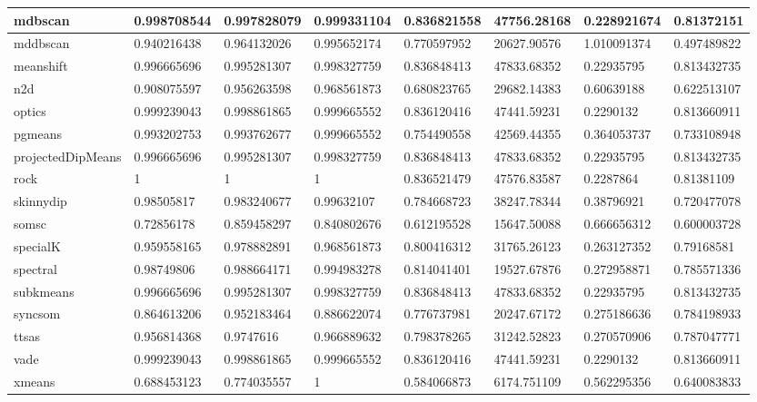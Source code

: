 \begin{table}[H]
\begin{tabular}{|l|l|l|l|l|l|l|l|}
\hline
mdbscan & 0.998708544 & 0.997828079 & 0.999331104 & 0.836821558 & 47756.28168 & 0.228921674 & 0.81372151 \\
\hline
mddbscan & 0.940216438 & 0.964132026 & 0.995652174 & 0.770597952 & 20627.90576 & 1.010091374 & 0.497489822 \\
\hline
meanshift & 0.996665696 & 0.995281307 & 0.998327759 & 0.836848413 & 47833.68352 & 0.22935795 & 0.813432735 \\
\hline
n2d & 0.908075597 & 0.956263598 & 0.968561873 & 0.680823765 & 29682.14383 & 0.60639188 & 0.622513107 \\
\hline
optics & 0.999239043 & 0.998861865 & 0.999665552 & 0.836120416 & 47441.59231 & 0.2290132 & 0.813660911 \\
\hline
pgmeans & 0.993202753 & 0.993762677 & 0.999665552 & 0.754490558 & 42569.44355 & 0.364053737 & 0.733108948 \\
\hline
projectedDipMeans & 0.996665696 & 0.995281307 & 0.998327759 & 0.836848413 & 47833.68352 & 0.22935795 & 0.813432735 \\
\hline
rock & 1 & 1 & 1 & 0.836521479 & 47576.83587 & 0.2287864 & 0.81381109 \\
\hline
skinnydip & 0.98505817 & 0.983240677 & 0.99632107 & 0.784668723 & 38247.78344 & 0.38796921 & 0.720477078 \\
\hline
somsc & 0.72856178 & 0.859458297 & 0.840802676 & 0.612195528 & 15647.50088 & 0.666656312 & 0.600003728 \\
\hline
specialK & 0.959558165 & 0.978882891 & 0.968561873 & 0.800416312 & 31765.26123 & 0.263127352 & 0.79168581 \\
\hline
spectral & 0.98749806 & 0.988664171 & 0.994983278 & 0.814041401 & 19527.67876 & 0.272958871 & 0.785571336 \\
\hline
subkmeans & 0.996665696 & 0.995281307 & 0.998327759 & 0.836848413 & 47833.68352 & 0.22935795 & 0.813432735 \\
\hline
syncsom & 0.864613206 & 0.952183464 & 0.886622074 & 0.776737981 & 20247.67172 & 0.275186636 & 0.784198933 \\
\hline
ttsas & 0.956814368 & 0.9747616 & 0.966889632 & 0.798378265 & 31242.52823 & 0.270570906 & 0.787047771 \\
\hline
vade & 0.999239043 & 0.998861865 & 0.999665552 & 0.836120416 & 47441.59231 & 0.2290132 & 0.813660911 \\
\hline
xmeans & 0.688453123 & 0.774035557 & 1 & 0.584066873 & 6174.751109 & 0.562295356 & 0.640083833 \\
\hline
\end{tabular}
\end{table}